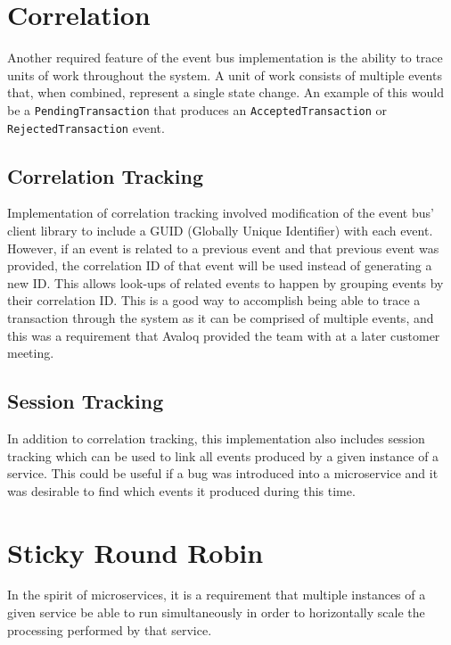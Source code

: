 \documentclass{l3proj}
\begin{document}
\section{Correlation}
\label{sec:correlation}

Another required feature of the event bus implementation is the ability to trace units of work throughout the system. A unit of work consists of multiple events that, when combined, represent a single state change. An example of this would be a \texttt{PendingTransaction} that produces an \texttt{AcceptedTransaction} or \texttt{RejectedTransaction} event.

\subsection{Correlation Tracking}
Implementation of correlation tracking involved modification of the event bus' client library to include a GUID (Globally Unique Identifier) with each event. However, if an event is related to a previous event and that previous event was provided, the correlation ID of that event will be used instead of generating a new ID. This allows look-ups of related events to happen by grouping events by their correlation ID. This is a good way to accomplish being able to trace a transaction through the system as it can be comprised of multiple events, and this was a requirement that Avaloq provided the team with at a later customer meeting.

\subsection{Session Tracking}
In addition to correlation tracking, this implementation also includes session tracking which can be used to link all events produced by a given instance of a service. This could be useful if a bug was introduced into a microservice and it was desirable to find which events it produced during this time.

\section{Sticky Round Robin}
\label{sec:sticky-round-robin}

In the spirit of microservices, it is a requirement that multiple instances of a given service be able to run simultaneously in order to horizontally scale the processing performed by that service.
\end{document}
